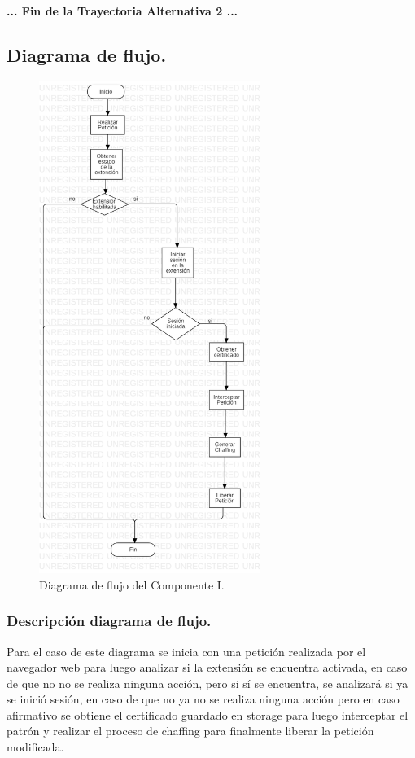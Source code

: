 \documentclass[12pt, a4paper, titlepage]{report}
\begin{document}
				\paragraph{... Fin de la Trayectoria Alternativa 2 ...}
				
				\newpage
		
			\subsection{Diagrama de flujo.}
			    
			    \begin{figure}[H]
					\begin{center}			    	\includegraphics[height=16cm]{./imagenes/Disenio/Componente_1/CI_DF.png}
						\caption{Diagrama de flujo del Componente I.}
					\end{center}
				\end{figure}
				
			    \subsubsection{Descripción diagrama de flujo.}
			        Para el caso de este diagrama se inicia con una petición realizada por el navegador web para luego analizar si la extensión se encuentra activada, en caso de que no no se realiza ninguna acción, pero si sí se encuentra, se analizará si ya se inició sesión, en caso de que no ya no se realiza ninguna acción pero en caso afirmativo se obtiene el certificado guardado en storage para luego interceptar el patrón y realizar el proceso de chaffing para finalmente liberar la petición modificada.
				
\end{document}
